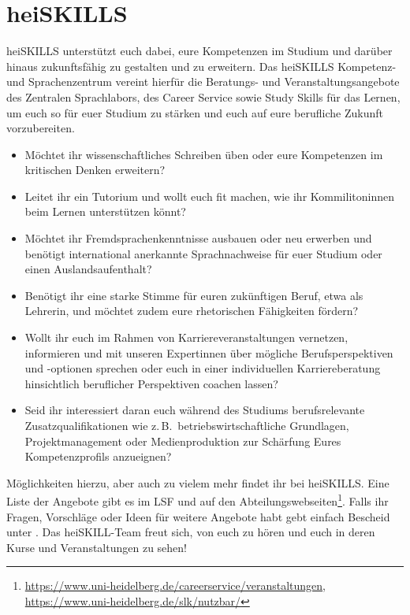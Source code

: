 \section{heiSKILLS}

heiSKILLS unterstützt euch dabei, eure Kompetenzen im Studium und darüber hinaus zukunftsfähig zu gestalten und zu erweitern. Das heiSKILLS Kompetenz- und Sprachenzentrum vereint hierfür die Beratungs- und Veranstaltungsangebote des Zentralen Sprachlabors, des Career Service sowie Study Skills für das Lernen, um euch so für euer Studium zu stärken und euch auf eure berufliche Zukunft vorzubereiten.

\begin{itemize}[leftmargin=3mm]
  \item Möchtet ihr wissenschaftliches Schreiben üben oder eure Kompetenzen im kritischen Denken erweitern?
  \item Leitet ihr ein Tutorium und wollt euch fit machen, wie ihr Kommilitoninnen beim Lernen unterstützen könnt?
  \item Möchtet ihr Fremdsprachenkenntnisse ausbauen oder neu erwerben und benötigt international anerkannte Sprachnachweise für euer Studium oder einen Auslandsaufenthalt?
  \item Benötigt ihr eine starke Stimme für euren zukünftigen Beruf, etwa als Lehrerin, und möchtet zudem eure rhetorischen Fähigkeiten fördern?
  \item Wollt ihr euch im Rahmen von Karriereveranstaltungen vernetzen, informieren und mit unseren Expertinnen über mögliche Berufsperspektiven und -optionen sprechen oder euch in einer individuellen Karriereberatung hinsichtlich beruflicher Perspektiven coachen lassen?
  \item Seid ihr interessiert daran euch während des Studiums berufsrelevante Zusatzqualifikationen wie z.\,B.\, betriebswirtschaftliche Grundlagen, Projektmanagement oder Medienproduktion zur Schärfung Eures Kompetenzprofils anzueignen?

\end{itemize}

Möglichkeiten hierzu, aber auch zu vielem mehr findet ihr bei heiSKILLS.
Eine Liste der Angebote gibt es im LSF und auf den Abteilungswebseiten\footnote{\url{https://www.uni-heidelberg.de/careerservice/veranstaltungen}, \url{https://www.uni-heidelberg.de/slk/nutzbar/}}.
Falls ihr Fragen, Vorschläge oder Ideen für weitere Angebote habt gebt einfach Bescheid unter . Das heiSKILL-Team freut sich, von euch zu hören und euch in deren Kurse und Veranstaltungen zu sehen!

